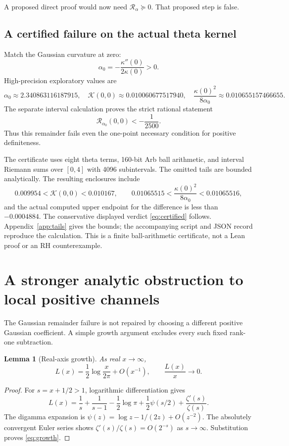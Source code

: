 \documentclass[11pt,letterpaper]{article}
\newtheorem{lemma}[theorem]{Lemma}
\theoremstyle{remark}\newtheorem{remark}[theorem]{Remark}
\newcommand{\K}{\mathcal K}\newcommand{\dd}{\,\mathrm d}
\numberwithin{equation}{section}
\begin{document}
A proposed direct proof would now need $\mathcal R_\alpha\succeq0$. That proposed step is false.

\subsection{A certified failure on the actual theta kernel}

Match the Gaussian curvature at zero:
\begin{equation}\label{eq:alpha}
\alpha_0=-\frac{\kappa''(0)}{2\kappa(0)}>0.
\end{equation}
High-precision exploratory values are
\[
\alpha_0\approx2.340863116187915,
\quad \K(0,0)\approx0.010060677517940,
\quad \frac{\kappa(0)^2}{8\alpha_0}\approx0.010655157466655.
\]
The separate interval calculation proves the strict rational statement
\begin{equation}\label{eq:certified}
\boxed{\mathcal R_{\alpha_0}(0,0)<-\frac1{2500}.}
\end{equation}
Thus this remainder fails even the one-point necessary condition for positive definiteness.

The certificate uses eight theta terms, 160-bit Arb ball arithmetic, and interval Riemann sums over $[0,4]$ with 4096 subintervals. The omitted tails are bounded analytically. The resulting enclosures include
\[
0.009954<\K(0,0)<0.010167,
\qquad
0.01065515<\frac{\kappa(0)^2}{8\alpha_0}<0.01065516,
\]
and the actual computed upper endpoint for the difference is less than $-0.0004884$. The conservative displayed verdict \eqref{eq:certified} follows. Appendix~\ref{app:tails} gives the bounds; the accompanying script and JSON record reproduce the calculation. This is a finite ball-arithmetic certificate, not a Lean proof or an RH counterexample.

\section{A stronger analytic obstruction to local positive channels}

The Gaussian remainder failure is not repaired by choosing a different positive Gaussian coefficient. A simple growth argument excludes every such fixed rank-one subtraction.

\begin{lemma}[Real-axis growth]\label{lem:growth}
As real $x\to\infty$,
\begin{equation}\label{eq:growth}
L(x)=\frac12\log\frac{x}{2\pi}+O(x^{-1}),\qquad \frac{L(x)}x\longrightarrow0.
\end{equation}
\end{lemma}
\begin{proof}
For $s=x+1/2>1$, logarithmic differentiation gives
\[
L(x)=\frac1s+\frac1{s-1}-\frac12\log\pi+
\frac12\psi(s/2)+\frac{\zeta'(s)}{\zeta(s)}.
\]
The digamma expansion \cite[5.11.2]{dlmf-gamma} is $\psi(z)=\log z-1/(2z)+O(z^{-2})$. The absolutely convergent Euler series shows $\zeta'(s)/\zeta(s)=O(2^{-s})$ as $s\to\infty$. Substitution proves \eqref{eq:growth}.
\end{proof}
\end{document}
